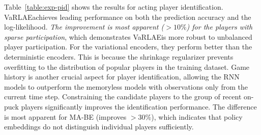\documentclass{article}
\newcommand{\system}{VaRLAE\;}
\begin{document}
Table~\ref{table:exp-pid} shows the results for acting player identification. \system achieves leading performance on both the prediction accuracy and the log-likelihood. {\it The improvement is most apparent ($>10\%$) for the players with sparse participation}, which demonstrates \system is more robust to unbalanced player participation. For the variational encoders, they perform better than the deterministic encoders. This is because the shrinkage regularizer prevents overfitting to the distribution of popular players in the training dataset.
Game history is another crucial aspect for player identification, allowing the RNN models to outperform the memoryless models with observations only from the current time step.
Constraining the candidate players to the group of recent on-puck players significantly improves the identification performance. The difference is most apparent for MA-BE (improves $>30\%$), which indicates that policy embeddings do not distinguish individual players sufficiently. 
\end{document}
